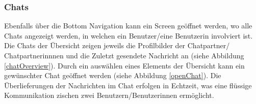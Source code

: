 \documentclass[../main.tex]{subfiles}
\begin{document}
\subsubsection*{Chats}
Ebenfalls über die Bottom Navigation kann ein Screen geöffnet werden, wo alle Chats angezeigt werden, in welchen ein Benutzer/eine Benutzerin involviert ist. Die Chats der Übersicht zeigen jeweils die Profilbilder der Chatpartner/ Chatpartnerinnnen und die Zuletzt gesendete Nachricht an (siehe Abbildung \ref{chatOverview}). Durch ein auswählen eines Elements der Übersicht kann ein gewünschter Chat geöffnet werden (siehe Abbildung \ref{openChat}). Die Überlieferungen der Nachrichten im Chat erfolgen in Echtzeit, was eine flüssige Kommunikation zischen zwei Benutzern/Benutzerinnen ermöglicht.
\end{document}
